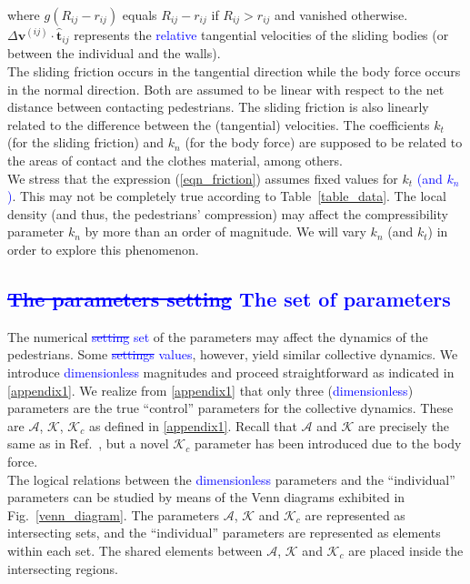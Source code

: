 \documentclass[preprint,12pt]{elsarticle}
\begin{document}
\noindent where $g(R_{ij}-r_{ij})$ equals $R_{ij}-r_{ij}$ if $R_{ij}>r_{ij}$ and 
vanished otherwise. $\Delta\mathbf{v}^{(ij)}\cdot\hat{\mathbf{t}}_{ij}$ 
represents the \textcolor{blue}{relative} tangential velocities of the sliding 
bodies (or between the individual and the walls).    \\

The sliding friction occurs in the tangential direction while the body force 
occurs in the normal direction. Both are assumed to be linear with respect to 
the net distance between contacting pedestrians. The sliding friction is also 
linearly related to the difference between the (tangential) velocities. The 
coefficients $k_t$ (for the sliding friction) and $k_n$ (for the 
body force) are supposed to be related to the areas of contact and the clothes 
material, among others. \\

We stress that the expression (\ref{eqn_friction}) assumes fixed values for 
$k_t$ \textcolor{blue}{(and $k_n$)}. This may not be completely true according to 
Table~\ref{table_data}. The local density (and thus, the pedestrians' 
compression) may affect the compressibility parameter $k_n$ by more than an order 
of magnitude. We will vary $k_n$ (and $k_t$) in order to explore this 
phenomenon. \\  


\subsection{\label{parameters} \textcolor{blue}{\sout{The parameters setting} The set of parameters}}

The numerical \textcolor{blue}{\sout{setting} set} of the parameters may affect the dynamics of the 
pedestrians. Some \textcolor{blue}{\sout{settings} values}, however, yield similar collective dynamics.
We introduce \textcolor{blue}{dimensionless} magnitudes 
and proceed straightforward as indicated in \ref{appendix1}. We realize from 
\ref{appendix1} that only three (\textcolor{blue}{dimensionless}) parameters  are the true 
``control'' parameters for the collective dynamics. These are $\mathcal{A}$, 
$\mathcal{K}$, $\mathcal{K}_c$ as defined in \ref{appendix1}. Recall that 
$\mathcal{A}$ and $\mathcal{K}$ are precisely the same as in 
Ref.~\cite{dorso_2019}, but a novel $\mathcal{K}_c$ parameter has been 
introduced due to the body force.   \\

The logical relations between the \textcolor{blue}{dimensionless} parameters and the ``individual'' 
parameters can be studied by means of the Venn diagrams exhibited in 
Fig.~\ref{venn_diagram}. The parameters $\mathcal{A}$, $\mathcal{K}$ and 
$\mathcal{K}_c$ are represented as intersecting sets, and the ``individual'' 
parameters are represented as elements within each set. The shared elements 
between $\mathcal{A}$, $\mathcal{K}$ and $\mathcal{K}_c$ are placed inside the 
intersecting regions. \\
\end{document}
